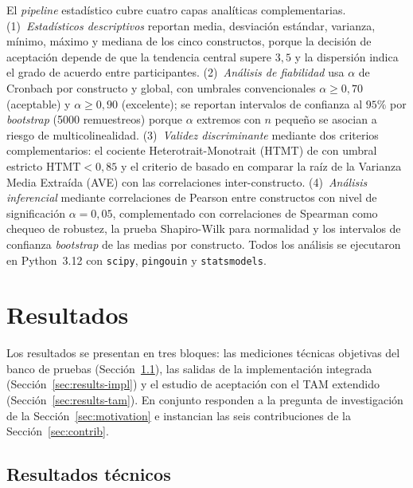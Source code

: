 \documentclass[a4paper,fleqn]{cas-sc}
\newcommand{\TAM}{TAM\xspace}
\begin{document}
	El \emph{pipeline} estad\'istico cubre cuatro capas anal\'iticas complementarias. (1)~\emph{Estad\'isticos descriptivos} reportan media, desviaci\'on est\'andar, varianza, m\'inimo, m\'aximo y mediana de los cinco constructos, porque la decisi\'on de aceptaci\'on depende de que la tendencia central supere $3{,}5$ \citep{lindner2024likert} y la dispersi\'on indica el grado de acuerdo entre participantes. (2)~\emph{An\'alisis de fiabilidad} usa $\alpha$ de Cronbach por constructo y global, con umbrales convencionales $\alpha\geq 0{,}70$ (aceptable) y $\alpha\geq 0{,}90$ (excelente); se reportan intervalos de confianza al $95\%$ por \emph{bootstrap} (5000 remuestreos) porque $\alpha$ extremos con $n$ peque\~no se asocian a riesgo de multicolinealidad. (3)~\emph{Validez discriminante} mediante dos criterios complementarios: el cociente Heterotrait-Monotrait (HTMT) de \citet{henseler2015htmt} con umbral estricto $\text{HTMT}<0{,}85$ y el criterio de \citet{fornell1981ave} basado en comparar la ra\'iz de la Varianza Media Extra\'ida (AVE) con las correlaciones inter-constructo. (4)~\emph{An\'alisis inferencial} mediante correlaciones de Pearson entre constructos con nivel de significaci\'on $\alpha=0{,}05$, complementado con correlaciones de Spearman como chequeo de robustez, la prueba Shapiro-Wilk para normalidad y los intervalos de confianza \emph{bootstrap} de las medias por constructo. Todos los an\'alisis se ejecutaron en Python~3.12 con \texttt{scipy}, \texttt{pingouin} y \texttt{statsmodels}.
	
	\section{Resultados}\label{sec:results}
	
	Los resultados se presentan en tres bloques: las mediciones t\'ecnicas objetivas del banco de pruebas (Secci\'on~\ref{sec:results-tech}), las salidas de la implementaci\'on integrada (Secci\'on~\ref{sec:results-impl}) y el estudio de aceptaci\'on con el \TAM extendido (Secci\'on~\ref{sec:results-tam}). En conjunto responden a la pregunta de investigaci\'on de la Secci\'on~\ref{sec:motivation} e instancian las seis contribuciones de la Secci\'on~\ref{sec:contrib}.
	
	\subsection{Resultados t\'ecnicos}\label{sec:results-tech}
	
\end{document}
